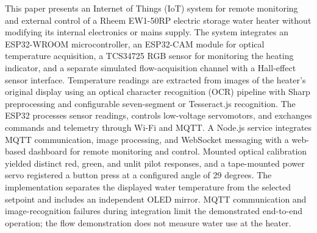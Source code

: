 This paper presents an Internet of Things (IoT) system for remote monitoring and external control of a Rheem EW1-50RP
electric storage water heater without modifying its internal electronics or mains supply.
The system integrates an ESP32-WROOM microcontroller, an ESP32-CAM module for optical temperature acquisition,
a TCS34725 RGB sensor for monitoring the heating indicator, and a separate simulated flow-acquisition channel with a Hall-effect sensor interface.
Temperature readings are extracted from images of the heater's original display using an optical character recognition (OCR)
pipeline with Sharp preprocessing and configurable seven-segment or Tesseract.js recognition. The ESP32 processes sensor readings, controls low-voltage servomotors, and exchanges
commands and telemetry through Wi-Fi and MQTT. A Node.js service integrates MQTT communication, image processing, and
WebSocket messaging with a web-based dashboard for remote monitoring and control. Mounted optical calibration yielded distinct red, green, and unlit pilot responses, and a tape-mounted power servo registered a button press at a configured angle of 29 degrees. The implementation separates the displayed water temperature from the selected setpoint and includes an independent OLED mirror. MQTT communication and image-recognition failures during integration limit the demonstrated end-to-end operation; the flow demonstration does not measure water use at the heater.
